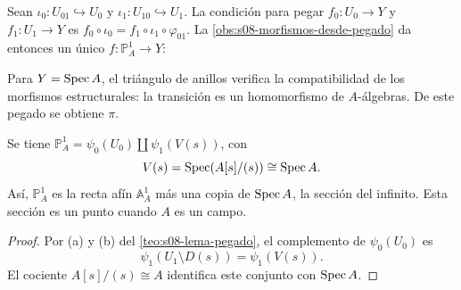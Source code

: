 Sean $\iota_0\colon U_{01}\hookrightarrow U_0$ y $\iota_1\colon U_{10}\hookrightarrow U_1$. La condición para pegar $f_0\colon U_0\to Y$ y $f_1\colon U_1\to Y$ es $f_0\circ\iota_0=f_1\circ\iota_1\circ\varphi_{01}$. La \cref{obs:s08-morfismos-desde-pegado} da entonces un único $f\colon \mathbb P_A^1\to Y$:
\begin{center}
\begin{minipage}{.59\textwidth}
\centering
{}
\end{minipage}\hfill
\begin{minipage}{.37\textwidth}
\centering
{}
\end{minipage}
\end{center}
Para $Y=\operatorname{Spec} A$, el triángulo de anillos verifica la compatibilidad de los morfismos estructurales: la transición es un homomorfismo de $A$-álgebras. De este pegado se obtiene $\pi$.

\begin{prop}
\label{prop:s08-proyectiva-como-conjunto}
Se tiene $\mathbb P_A^1=\psi_0(U_0)\amalg\psi_1(V(s))$, con
\[
V(s)=\operatorname{Spec}(A[s]/(s))\cong\operatorname{Spec} A.
\]
Así, $\mathbb P_A^1$ es la recta afín $\mathbb A_A^1$ más una copia de $\operatorname{Spec} A$, la sección del infinito. Esta sección es un punto cuando $A$ es un campo.
\end{prop}
\begin{proof}
Por (a) y (b) del \cref{teo:s08-lema-pegado}, el complemento de $\psi_0(U_0)$ es
\[
\psi_1(U_1\setminus D(s))=\psi_1(V(s)).
\]
El cociente $A[s]/(s)\cong A$ identifica este conjunto con $\operatorname{Spec} A$.
\end{proof}

